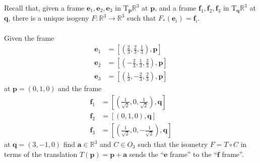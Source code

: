 \documentclass[12 pt, letterpaper]{hmcpset}
\begin{document}
\pagebreak

\begin{problem}[Problem 5.]
	Recall that, given a frame $\mathbf{e}_{1}, \mathbf{e}_{2}, \mathbf{e}_{3}$ in $\mathrm{T}_{\mathbf{p}}\mathbb{R}^{3}$ at $\mathbf{p}$, and a frame $\mathbf{f}_{1}, \mathbf{f}_{2}, \mathbf{f}_{3}$ in $\mathrm{T}_{\mathbf{q}}\mathbb{R}^{3}$	at $\mathbf{q}$, there is a unique isogeny $F : \mathbb{R}^{3} \to \mathbb{R}^{3}$ such that $F_{*}(\mathbf{e}_{i}) = \mathbf{f}_{i}$. \\\\
	Given the frame
	\[
		\begin{split}
			\mathbf{e}_{1} & = \left [ \left ( \frac{2}{3}, \frac{2}{3}, \frac{1}{3} \right ), \mathbf{p} \right ] \\
			\mathbf{e}_{2} & = \left [ \left ( -\frac{2}{3}, \frac{1}{3}, \frac{2}{3} \right ), \mathbf{p} \right ] \\
			\mathbf{e}_{3} & = \left [ \left ( \frac{1}{3}, -\frac{2}{3}, \frac{2}{3} \right ), \mathbf{p} \right ]
		\end{split}
	\]
	at $\mathbf{p} = (0, 1, 0)$ and the frame
	\[
		\begin{split}
			\mathbf{f}_{1} & = \left [ \left ( \frac{1}{\sqrt 2}, 0, \frac{1}{\sqrt 2} \right ), \mathbf{q} \right ] \\
			\mathbf{f}_{2} & = \left [ \left ( 0, 1, 0 \right ), \mathbf{q} \right ] \\
			\mathbf{f}_{3} & = \left [ \left ( \frac{1}{\sqrt 2}, 0, -\frac{1}{\sqrt 2} \right ), \mathbf{q} \right ]
		\end{split}
	\]
	at $\mathbf{q} = (3, -1, 0)$ find $\mathbf{a} \in \mathbb{R}^{3}$ and $C \in O_{3}$ such that the isometry $F = T \circ C$ in terms of the translation $T(\mathbf{p}) = \mathbf{p} + \mathbf{a}$ sends the ``$\mathbf{e}$ frame'' to the ``$\mathbf{f}$ frame''.
\end{problem}
\end{document}
